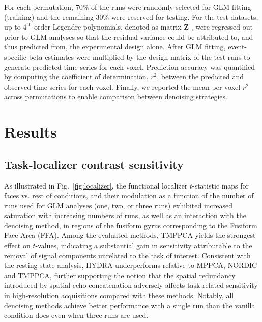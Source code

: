 \begin{itemize}
{For each permutation, $70\%$ of the runs were randomly selected for GLM fitting (training) and the remaining $30\%$ were reserved for testing. For the test datasets, up to $4^{\textrm{th}}$-order Legendre polynomials, denoted as matrix $\mathbf{Z}$ 
, were regressed out prior to GLM analyses so that the residual variance could be attributed to, and thus predicted from, the experimental design alone. After GLM fitting, event-specific beta estimates were multiplied by the design matrix of the test runs to generate predicted time series for each voxel. Prediction accuracy was quantified by computing the coefficient of determination, $r^{2}$, between the predicted and observed time series for each voxel. Finally, we reported the mean per-voxel $r^{2}$ across permutations to enable comparison between denoising strategies.}
\end{itemize}


\section{Results}

\subsection{Task-localizer contrast sensitivity}

As illustrated in Fig.~\ref{fig:localizer}, the functional localizer $t$-statistic maps for faces vs. rest of conditions, and their modulation as a function of the number of runs used for GLM analyses (one, two, or three runs) exhibited increased saturation with increasing numbers of runs, as well as an interaction with the denoising method, in regions of the fusiform gyrus corresponding to the Fusiform Face Area (FFA). Among the evaluated methods, TMPPCA yields the strongest effect on $t$-values, indicating a substantial gain in sensitivity attributable to the removal of signal components unrelated to the task of interest. Consistent with the resting-state analysis, HYDRA underperforms relative to MPPCA, NORDIC and TMPPCA, further supporting the notion that the spatial redundancy introduced by spatial echo concatenation adversely affects task-related sensitivity in high-resolution acquisitions compared with these methods. Notably, all denoising methods achieve better performance with a single run than the vanilla condition does even when three runs are used.

